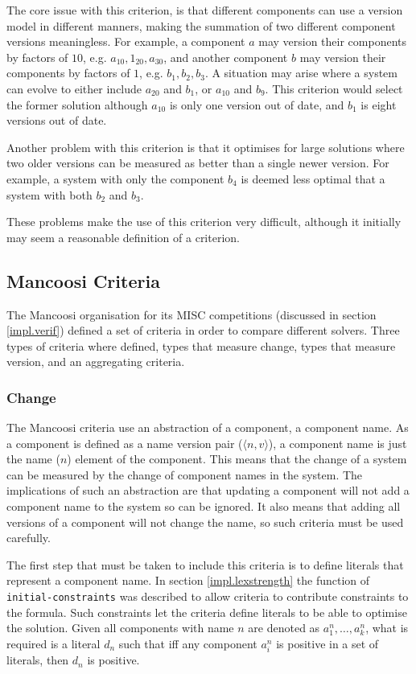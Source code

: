 The core issue with this criterion, is that different components can use a version model in different manners, making the summation of two different component versions meaningless.
For example, a component $a$ may version their components by factors of $10$, e.g. $a_{10},1_{20},a_{30}$, 
and another component $b$ may version their components by factors of $1$, e.g. $b_1,b_2,b_3$.
A situation may arise where a system can evolve to either include $a_20$ and $b_1$, or $a_10$ and $b_9$.
This criterion would select the former solution although $a_10$ is only one version out of date, and $b_1$ is eight versions out of date. 

Another problem with this criterion is that it optimises for large solutions where two older versions can be measured as better than a single newer version.
For example, a system with only the component $b_4$ is deemed less optimal that a system with both $b_2$ and $b_3$.

These problems make the use of this criterion very difficult, although it initially may seem a reasonable definition of a criterion.   


\subsection{Mancoosi Criteria}
The Mancoosi organisation for its MISC competitions (discussed in section \ref{impl.verif}) defined a set of criteria in order to compare different solvers.
Three types of criteria where defined, types that measure change, types that measure version, and an aggregating criteria. 

\subsubsection{Change}
The Mancoosi criteria use an abstraction of a component, a component name. 
As a component is defined as a name version pair ($\langle n,v \rangle$), a component name is just the name ($n$) element of the component. 
This means that the change of a system can be measured by the change of component names in the system.
The implications of such an abstraction are that updating a component will not add a component name to the system so can be ignored.
It also means that adding all versions of a component will not change the name, so such criteria must be used carefully.

The first step that must be taken to include this criteria is to define literals that represent a component name.
In section \ref{impl.lexstrength} the function of \verb+initial-constraints+ was described to allow criteria to contribute constraints to the formula.
Such constraints let the criteria define literals to be able to optimise the solution.
Given all components with name $n$ are denoted as $a^n_1,\ldots,a^n_k$,
what is required is a literal $d_n$ such that iff any component $a^n_i$ is positive in a set of literals, then $d_n$ is positive.

